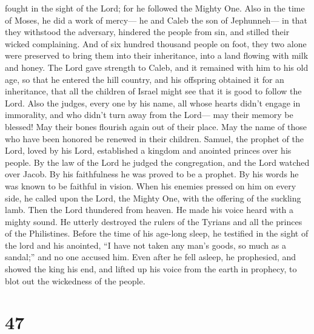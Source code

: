 fought in the sight of the Lord; for he followed the Mighty One.
 Also in the time of Moses, he did a work of mercy--- he
and Caleb the son of Jephunneh--- in that they withstood the adversary,
hindered the people from sin, and stilled their wicked complaining.
 And of six hundred thousand people on foot, they two
alone were preserved to bring them into their inheritance, into a land
flowing with milk and honey.  The Lord gave strength to
Caleb, and it remained with him to his old age, so that he entered the
hill country, and his offspring obtained it for an inheritance,
 that all the children of Israel might see that it is
good to follow the Lord.  Also the judges, every one by
his name, all whose hearts didn't engage in immorality, and who didn't
turn away from the Lord--- may their memory be blessed! 
May their bones flourish again out of their place. May the name of those
who have been honored be renewed in their children. 
Samuel, the prophet of the Lord, loved by his Lord, established a
kingdom and anointed princes over his people.  By the law
of the Lord he judged the congregation, and the Lord watched over Jacob.
 By his faithfulness he was proved to be a prophet. By
his words he was known to be faithful in vision.  When
his enemies pressed on him on every side, he called upon the Lord, the
Mighty One, with the offering of the suckling lamb.  Then
the Lord thundered from heaven. He made his voice heard with a mighty
sound.  He utterly destroyed the rulers of the Tyrians
and all the princes of the Philistines.  Before the time
of his age-long sleep, he testified in the sight of the lord and his
anointed, ``I have not taken any man's goods, so much as a sandal;'' and
no one accused him.  Even after he fell asleep, he
prophesied, and showed the king his end, and lifted up his voice from
the earth in prophecy, to blot out the wickedness of the people.

\hypertarget{section-33}{%
\section{47}\label{section-33}}

